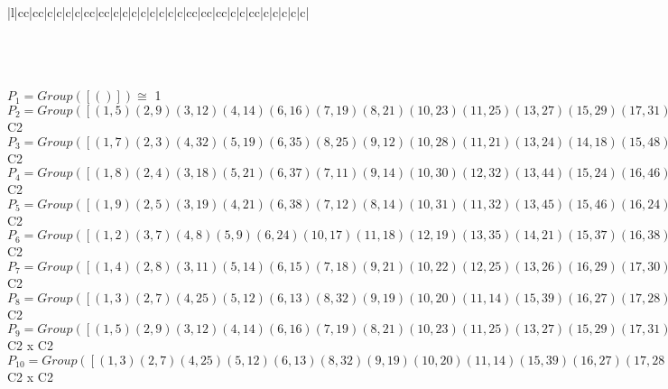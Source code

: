 \documentclass[varwidth=\maxdimen,border=10]{standalone}
\begin{document}
\begin{tabular}
\begin{array}{|l|cc|cc|c|c|c|c|cc|cc|c|c|c|c|c|c|c|c|cc|cc|cc|c|c|cc|c|c|c|c|c|}
\end{array}\)\\
\ \\
\ \\
$P_{1} = Group( [ () ] )\cong$ 1\ \\
$P_{2} = Group( [ ( 1, 5)( 2, 9)( 3,12)( 4,14)( 6,16)( 7,19)( 8,21)(10,23)(11,25)(13,27)(15,29)(17,31)(18,32)(20,34)(22,36)(24,38)(26,39)(28,41)(30,42)(33,43)(35,45)(37,46)(40,47)(44,48) ] )\cong$ C2\ \\
$P_{3} = Group( [ ( 1, 7)( 2, 3)( 4,32)( 5,19)( 6,35)( 8,25)( 9,12)(10,28)(11,21)(13,24)(14,18)(15,48)(16,45)(17,20)(22,47)(23,41)(26,46)(27,38)(29,44)(30,43)(31,34)(33,42)(36,40)(37,39) ] )\cong$ C2\ \\
$P_{4} = Group( [ ( 1, 8)( 2, 4)( 3,18)( 5,21)( 6,37)( 7,11)( 9,14)(10,30)(12,32)(13,44)(15,24)(16,46)(17,22)(19,25)(20,40)(23,42)(26,35)(27,48)(28,33)(29,38)(31,36)(34,47)(39,45)(41,43) ] )\cong$ C2\ \\
$P_{5} = Group( [ ( 1, 9)( 2, 5)( 3,19)( 4,21)( 6,38)( 7,12)( 8,14)(10,31)(11,32)(13,45)(15,46)(16,24)(17,23)(18,25)(20,41)(22,42)(26,48)(27,35)(28,34)(29,37)(30,36)(33,47)(39,44)(40,43) ] )\cong$ C2\ \\
$P_{6} = Group( [ ( 1, 2)( 3, 7)( 4, 8)( 5, 9)( 6,24)(10,17)(11,18)(12,19)(13,35)(14,21)(15,37)(16,38)(20,28)(22,30)(23,31)(25,32)(26,44)(27,45)(29,46)(33,40)(34,41)(36,42)(39,48)(43,47) ] )\cong$ C2\ \\
$P_{7} = Group( [ ( 1, 4)( 2, 8)( 3,11)( 5,14)( 6,15)( 7,18)( 9,21)(10,22)(12,25)(13,26)(16,29)(17,30)(19,32)(20,33)(23,36)(24,37)(27,39)(28,40)(31,42)(34,43)(35,44)(38,46)(41,47)(45,48) ] )\cong$ C2\ \\
$P_{8} = Group( [ ( 1, 3)( 2, 7)( 4,25)( 5,12)( 6,13)( 8,32)( 9,19)(10,20)(11,14)(15,39)(16,27)(17,28)(18,21)(22,43)(23,34)(24,35)(26,29)(30,47)(31,41)(33,36)(37,48)(38,45)(40,42)(44,46) ] )\cong$ C2\ \\
$P_{9} = Group( [ ( 1, 5)( 2, 9)( 3,12)( 4,14)( 6,16)( 7,19)( 8,21)(10,23)(11,25)(13,27)(15,29)(17,31)(18,32)(20,34)(22,36)(24,38)(26,39)(28,41)(30,42)(33,43)(35,45)(37,46)(40,47)(44,48), ( 1, 7)( 2, 3)( 4,32)( 5,19)( 6,35)( 8,25)( 9,12)(10,28)(11,21)(13,24)(14,18)(15,48)(16,45)(17,20)(22,47)(23,41)(26,46)(27,38)(29,44)(30,43)(31,34)(33,42)(36,40)(37,39) ] )\cong$ C2 x C2\ \\
$P_{10} = Group( [ ( 1, 3)( 2, 7)( 4,25)( 5,12)( 6,13)( 8,32)( 9,19)(10,20)(11,14)(15,39)(16,27)(17,28)(18,21)(22,43)(23,34)(24,35)(26,29)(30,47)(31,41)(33,36)(37,48)(38,45)(40,42)(44,46), ( 1, 2)( 3, 7)( 4, 8)( 5, 9)( 6,24)(10,17)(11,18)(12,19)(13,35)(14,21)(15,37)(16,38)(20,28)(22,30)(23,31)(25,32)(26,44)(27,45)(29,46)(33,40)(34,41)(36,42)(39,48)(43,47) ] )\cong$ C2 x C2\ \\

\end{tabular}
\end{document}
